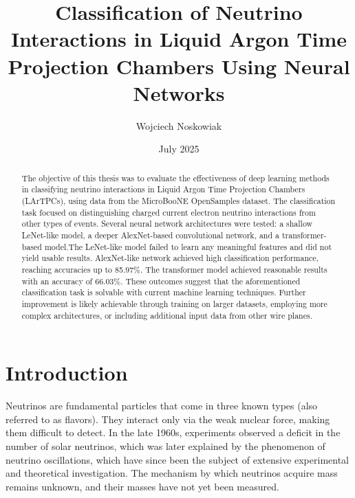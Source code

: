 \documentclass{pracalicmgr}
\author{Wojciech Noskowiak}
\title{Classification of Neutrino Interactions in Liquid Argon Time Projection Chambers Using Neural Networks}
\date{July 2025}
\begin{document}
\setlength{\textheight}{24.5cm}
\setlength{\textwidth}{16cm}
\setlength{\topmargin}{-0.5cm}
\setlength{\headheight}{0cm}
\setlength{\oddsidemargin}{0.5cm}
\setlength{\evensidemargin}{-0.5cm}

\maketitle
\let\cleardoublepage\clearpage

\begin{abstract}
The objective of this thesis was to evaluate the effectiveness of deep learning methods in classifying neutrino interactions in Liquid Argon Time Projection Chambers (LArTPCs), using data from the MicroBooNE OpenSamples dataset. The classification task focused on distinguishing charged current electron neutrino interactions from other types of events. Several neural network architectures were tested: a shallow LeNet-like model, a deeper AlexNet-based convolutional network, and a transformer-based model.The LeNet-like model failed to learn any meaningful features and did not yield usable results. AlexNet-like network achieved high classification performance, reaching accuracies up to 85.97\%. The transformer model achieved reasonable results with an accuracy of 66.03\%. These outcomes suggest that the aforementioned classification task is solvable with current machine learning techniques. Further improvement is likely achievable through training on larger datasets, employing more complex architectures, or including additional input data from other wire planes.

\end{abstract}

\clearpage
\thispagestyle{empty}
\mbox{}

\clearpage
\tableofcontents

\chapter*{Introduction}

Neutrinos are fundamental particles that come in three known types (also referred to as flavors). They interact only via the weak nuclear force, making them difficult to detect. In the late 1960s, experiments observed a deficit in the number of solar neutrinos, which was later explained by the phenomenon of neutrino oscillations, which have since been the subject of extensive experimental and theoretical investigation\cite{NeutrionoOscillationsHistory}. The mechanism by which neutrinos acquire mass remains unknown, and their masses have not yet been measured.
\end{document}
